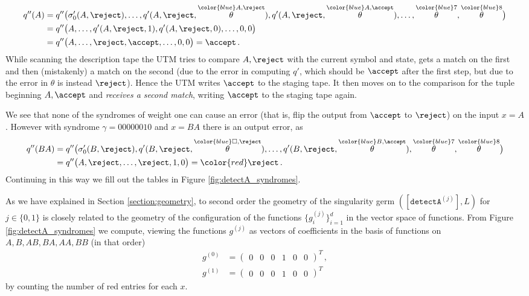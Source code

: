 \documentclass[english,letter paper,12pt,reqno]{article}
\theoremstyle{definition}
\newcommand{\detectA}{\texttt{detectA}}
\begin{document}
\begin{align*}
q''(A) &= q''\big(\sigma'_0(A, \reject), \ldots, q'(A, \reject, \overset{{\color{blue} A,\reject}}{\theta}), q'(A, \reject, \overset{{\color{blue} A,\accept}}{\theta}), \ldots, \overset{{\color{blue} 7}}{\theta}, \overset{{\color{blue} 8}}{\theta}\big)\\
&= q''\big( A, \ldots, q'(A, \reject, 1),q'(A, \reject, 0), \ldots, 0, 0\big)\\
&= q''\big( A, \ldots, \reject, \accept, \ldots, 0, 0 \big) = \accept\,.
\end{align*}
While scanning the description tape the UTM tries to compare $A, \reject$ with the current symbol and state, gets a match on the first and then (mistakenly) a match on the second (due to the error in computing $q'$, which should be $\accept$ after the first step, but due to the error in $\theta$ is instead $\reject$). Hence the UTM writes $\accept$ to the staging tape. It then moves on to the comparison for the tuple beginning $A, \accept$ and \emph{receives a second match}, writing $\accept$ to the staging tape again.

We see that none of the syndromes of weight one can cause an error (that is, flip the output from $\accept$ to $\reject$) on the input $x = A$. However with syndrome $\gamma = 00000010$ and $x = BA$ there is an output error, as
\begin{align*}
q''(BA) &= q''\big(\sigma'_0(B, \reject), q'(B, \reject, \overset{{\color{blue} \Box,\reject}}{\theta}), \ldots, q'(B, \reject, \overset{{\color{blue} B,\accept}}{\theta}), \overset{{\color{blue} 7}}{\theta}, \overset{{\color{blue} 8}}{\theta}\big)\\
&= q''\big( A, \reject, \ldots, \reject, 1, 0 \big) = {\color{red} \reject}\,.
\end{align*}
Continuing in this way we fill out the tables in Figure \ref{fig:detectA_syndromes}.

As we have explained in Section \ref{section:geometry}, to second order the geometry of the singularity germ $([\detectA^{(j)}], L)$ for $j \in \{0,1\}$ is closely related to the geometry of the configuration of the functions $\{ g^{(j)}_i \}_{i=1}^d$ in the vector space of functions. From Figure \ref{fig:detectA_syndromes} we compute, viewing the functions $g^{(j)}$ as vectors of coefficients in the basis of functions on $A, B, AB, BA, AA, BB$ (in that order)
\begin{align}
    g^{(0)} &= \begin{pmatrix} 0 & 0 & 0 & 1 & 0 & 0 \end{pmatrix}^T\,,\\
    g^{(1)} &= \begin{pmatrix} 0 & 0 & 0 & 1 & 0 & 0 \end{pmatrix}^T
\end{align}
by counting the number of red entries for each $x$. 
\end{document}
